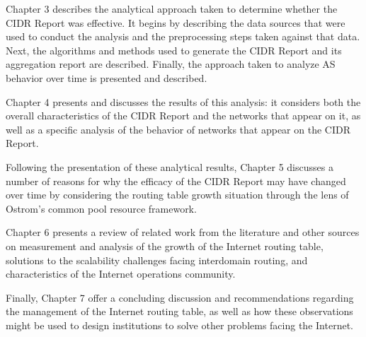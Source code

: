 Chapter 3 describes the analytical approach taken to determine whether the CIDR
Report was effective. It begins by describing the data sources that were used
to conduct the analysis and the preprocessing steps taken against that data.
Next, the algorithms and methods used to generate the CIDR Report and its
aggregation report are described. Finally, the approach taken to analyze AS
behavior over time is presented and described.

Chapter 4 presents and discusses the results of this analysis: it considers
both the overall characteristics of the CIDR Report and the networks that
appear on it, as well as a specific analysis of the behavior of networks that
appear on the CIDR Report.

Following the presentation of these analytical results, Chapter 5 discusses a
number of reasons for why the efficacy of the CIDR Report may have changed over
time by considering the routing table growth situation through the lens of
Ostrom's common pool resource framework.

Chapter 6 presents a review of related work from the literature and other
sources on measurement and analysis of the growth of the Internet routing
table, solutions to the scalability challenges facing interdomain routing, and
characteristics of the Internet operations community.

Finally, Chapter 7 offer a concluding discussion and recommendations regarding
the management of the Internet routing table, as well as how these observations
might be used to design institutions to solve other problems facing the
Internet.
